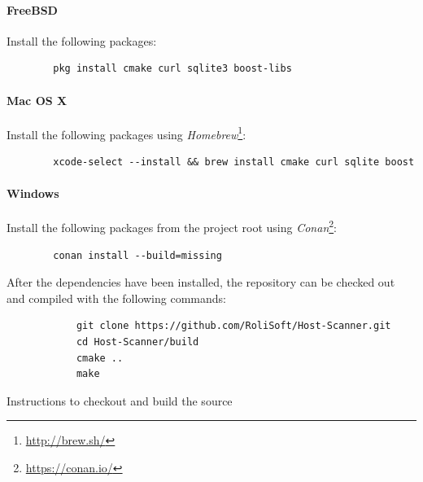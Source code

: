 \documentclass[a4paper,12pt]{article}
\begin{document}
	\vspace{-0.4in}
	\paragraph*{FreeBSD} Install the following packages:
	
	\begin{listing}[H]
	\begin{verbatim}
		pkg install cmake curl sqlite3 boost-libs
	\end{verbatim}
	\end{listing}
		
	\vspace{-0.4in}
	\paragraph*{Mac OS X} Install the following packages using \textit{Homebrew}\footnote{\url{http://brew.sh/}}:
	
	\begin{listing}[H]
	\begin{verbatim}
		xcode-select --install && brew install cmake curl sqlite boost
	\end{verbatim}
	\end{listing}
		
	\vspace{-0.4in}
	\paragraph*{Windows} Install the following packages from the project root using \textit{Conan}\footnote{\url{https://conan.io/}}:
	
	\begin{listing}[H]
	\begin{verbatim}
		conan install --build=missing
	\end{verbatim}
	\end{listing}
	
	\vspace{-0.1in}
	After the dependencies have been installed, the repository can be checked out and compiled with the following commands:
	
	\begin{listing}[H]
		\begin{verbatim}
			git clone https://github.com/RoliSoft/Host-Scanner.git
			cd Host-Scanner/build
			cmake ..
			make
		\end{verbatim}
		\caption{Instructions to checkout and build the source}
		\label{clonebuild}
	\end{listing}
	
\end{document}
